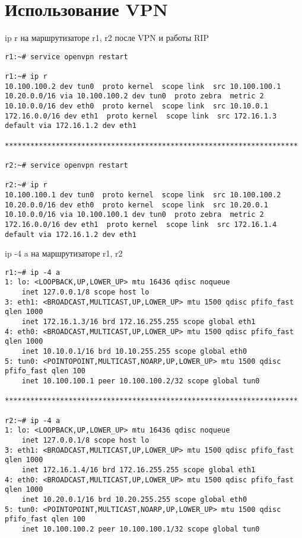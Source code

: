 \documentclass[a4paper,12pt]{article}
\begin{document}
\section{Использование VPN}

ip r на маршрутизаторе r1, r2 после VPN и работы RIP

\begin{Verbatim}
r1:~# service openvpn restart

r1:~# ip r
10.100.100.2 dev tun0  proto kernel  scope link  src 10.100.100.1 
10.20.0.0/16 via 10.100.100.2 dev tun0  proto zebra  metric 2 
10.10.0.0/16 dev eth0  proto kernel  scope link  src 10.10.0.1 
172.16.0.0/16 dev eth1  proto kernel  scope link  src 172.16.1.3 
default via 172.16.1.2 dev eth1

*********************************************************************

r2:~# service openvpn restart

r2:~# ip r
10.100.100.1 dev tun0  proto kernel  scope link  src 10.100.100.2 
10.20.0.0/16 dev eth0  proto kernel  scope link  src 10.20.0.1 
10.10.0.0/16 via 10.100.100.1 dev tun0  proto zebra  metric 2 
172.16.0.0/16 dev eth1  proto kernel  scope link  src 172.16.1.4 
default via 172.16.1.2 dev eth1 
\end{Verbatim}

ip -4 a  на маршрутизаторе r1, r2

\begin{Verbatim}
r1:~# ip -4 a
1: lo: <LOOPBACK,UP,LOWER_UP> mtu 16436 qdisc noqueue 
    inet 127.0.0.1/8 scope host lo
3: eth1: <BROADCAST,MULTICAST,UP,LOWER_UP> mtu 1500 qdisc pfifo_fast qlen 1000
    inet 172.16.1.3/16 brd 172.16.255.255 scope global eth1
4: eth0: <BROADCAST,MULTICAST,UP,LOWER_UP> mtu 1500 qdisc pfifo_fast qlen 1000
    inet 10.10.0.1/16 brd 10.10.255.255 scope global eth0
5: tun0: <POINTOPOINT,MULTICAST,NOARP,UP,LOWER_UP> mtu 1500 qdisc pfifo_fast qlen 100
    inet 10.100.100.1 peer 10.100.100.2/32 scope global tun0

*********************************************************************

r2:~# ip -4 a
1: lo: <LOOPBACK,UP,LOWER_UP> mtu 16436 qdisc noqueue 
    inet 127.0.0.1/8 scope host lo
3: eth1: <BROADCAST,MULTICAST,UP,LOWER_UP> mtu 1500 qdisc pfifo_fast qlen 1000
    inet 172.16.1.4/16 brd 172.16.255.255 scope global eth1
4: eth0: <BROADCAST,MULTICAST,UP,LOWER_UP> mtu 1500 qdisc pfifo_fast qlen 1000
    inet 10.20.0.1/16 brd 10.20.255.255 scope global eth0
5: tun0: <POINTOPOINT,MULTICAST,NOARP,UP,LOWER_UP> mtu 1500 qdisc pfifo_fast qlen 100
    inet 10.100.100.2 peer 10.100.100.1/32 scope global tun0
\end{Verbatim}
\end{document}

